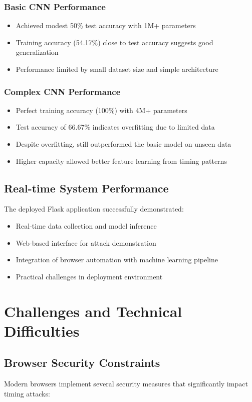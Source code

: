 \documentclass[11pt,a4paper]{article}
\begin{document}
\subsubsection{Basic CNN Performance}
\begin{itemize}
    \item Achieved modest 50\% test accuracy with 1M+ parameters
    \item Training accuracy (54.17\%) close to test accuracy suggests good generalization
    \item Performance limited by small dataset size and simple architecture
\end{itemize}

\subsubsection{Complex CNN Performance}
\begin{itemize}
    \item Perfect training accuracy (100\%) with 4M+ parameters
    \item Test accuracy of 66.67\% indicates overfitting due to limited data
    \item Despite overfitting, still outperformed the basic model on unseen data
    \item Higher capacity allowed better feature learning from timing patterns
\end{itemize}

\subsection{Real-time System Performance}
The deployed Flask application successfully demonstrated:
\begin{itemize}
    \item Real-time data collection and model inference
    \item Web-based interface for attack demonstration
    \item Integration of browser automation with machine learning pipeline
    \item Practical challenges in deployment environment
\end{itemize}

\section{Challenges and Technical Difficulties}

\subsection{Browser Security Constraints}
Modern browsers implement several security measures that significantly impact timing attacks:
\end{document}
